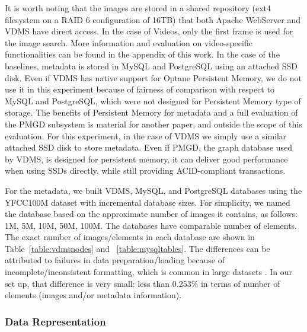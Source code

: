 It is worth noting that the images are stored in a shared repository
(ext4 filesystem on a RAID 6 configuration of 16TB) that both
Apache WebServer and VDMS have direct access.
In the case of Videos, only the first frame is used for the image search.
More information and evaluation on video-specific functionalities can be found
in the appendix of this work.
In the case of the baselines, metadata is
stored in MySQL and PostgreSQL using an attached SSD disk.
Even if VDMS has native support for Optane Persistent Memory,
we do not use it in this experiment because of fairness of
comparison with respect to MySQL and PostgreSQL, which were not designed for
Persistent Memory type of storage.
The benefits of Persistent Memory for metadata and a full evaluation of
the PMGD subsystem is material for another paper,
and outside the scope of this evaluation.
For this experiment, in the case of VDMS we simply use a similar
attached SSD disk to store metadata.
Even if PMGD, the graph database used by VDMS, is designed for persistent memory,
it can deliver good performance when using SSDs directly, while still
providing ACID-compliant transactions.

For the metadata, we built VDMS, MySQL, and PostgreSQL databases
using the YFCC100M dataset with incremental database sizes.
For simplicity, we named the database based on the approximate number of images
it contains, as follows: 1M, 5M, 10M, 50M, 100M.
The databases have comparable number of elements.
The exact number of images/elements in each database are shown in
Table~\ref{table:vdmsnodes} and ~\ref{table:mysqltables}.
The differences can be attributed to failures in data
preparation/loading because of incomplete/inconsistent formatting,
which is common in large datasets \cite{failures}.
In our set up, that difference is very small:
less than 0.253\% in terms of number of elements (images and/or metadata information).

\subsubsection{Data Representation}

